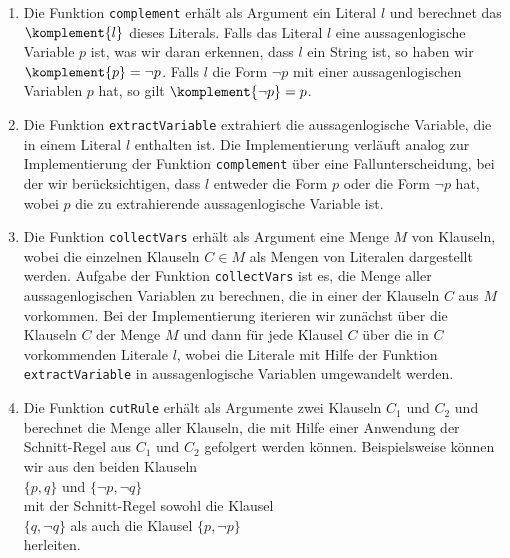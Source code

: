 \begin{enumerate}
\item Die Funktion \texttt{complement} erhält als Argument ein Literal $l$ und berechnet das
       $\komplement{l}$ dieses Literals.
      Falls das Literal $l$ eine aussagenlogische Variable $p$ ist, was wir daran erkennen, dass $l$ ein String
      ist, so haben wir $\komplement{p} = \neg p$.
      Falls $l$ die Form $\neg p$ mit einer aussagenlogischen Variablen $p$ hat, so gilt $\komplement{\neg p} =
      p$.
\item Die Funktion \texttt{extractVariable} extrahiert die aussagenlogische Variable, die in einem Literal $l$
      enthalten ist.  Die Implementierung verläuft analog zur Implementierung der Funktion
      \texttt{complement} über eine Fallunterscheidung, bei der wir berücksichtigen, dass $l$ entweder die Form
      $p$ oder die Form $\neg p$ hat, wobei $p$ die zu extrahierende aussagenlogische Variable ist.
\item Die Funktion \texttt{collectVars} erhält als Argument eine Menge $M$ von Klauseln, wobei die
      einzelnen Klauseln  \mbox{$C \!\in\! M$} als Mengen von Literalen dargestellt werden.  Aufgabe der
      Funktion \texttt{collectVars} ist es, die Menge aller aussagenlogischen Variablen zu
      berechnen, die in einer der Klauseln $C$ aus $M$ vorkommen.  Bei der Implementierung iterieren
      wir zunächst über die Klauseln $C$ der Menge $M$ und dann für jede Klausel $C$ über die in $C$
      vorkommenden Literale $l$, wobei die Literale mit Hilfe der Funktion \texttt{extractVariable} in
      aussagenlogische Variablen umgewandelt werden.
\item Die Funktion \texttt{cutRule} erhält als Argumente zwei Klauseln $C_1$ und $C_2$ und berechnet
      die Menge aller Klauseln, die mit Hilfe einer Anwendung der Schnitt-Regel aus $C_1$ und $C_2$ gefolgert werden
      können.  Beispielsweise können wir aus den beiden Klauseln
      \\[0.2cm]
      \hspace*{1.3cm}
      $\{ p, q \}$ \quad und \quad $\{ \neg p, \neg q \}$ 
      \\[0.2cm]
      mit der Schnitt-Regel sowohl die Klausel
      \\[0.2cm]
      \hspace*{1.3cm}
      $\{q, \neg q\}$ \quad als auch die Klausel \quad $\{p, \neg p \}$
      \\[0.2cm]
      herleiten.
\end{enumerate}


